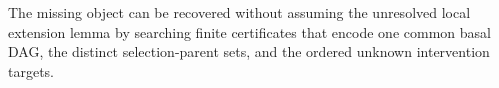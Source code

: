 The missing object can be recovered without assuming the unresolved local extension lemma by searching finite certificates that encode one common basal DAG, the distinct selection-parent sets, and the ordered unknown intervention targets.